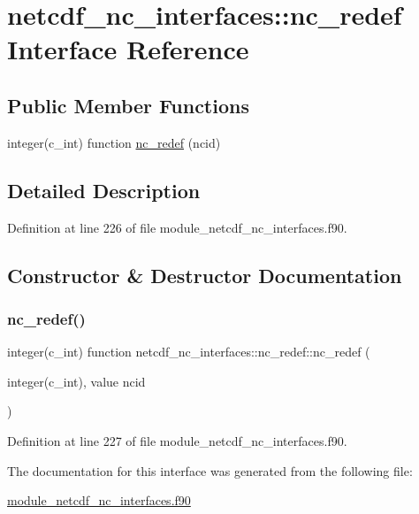 \hypertarget{interfacenetcdf__nc__interfaces_1_1nc__redef}{}\section{netcdf\+\_\+nc\+\_\+interfaces\+:\+:nc\+\_\+redef Interface Reference}
\label{interfacenetcdf__nc__interfaces_1_1nc__redef}
\subsection*{Public Member Functions}
\begin{DoxyCompactItemize}
\item 
integer(c\+\_\+int) function \hyperlink{interfacenetcdf__nc__interfaces_1_1nc__redef_a376167f0f58a802775e3701f8acf2d70}{nc\+\_\+redef} (ncid)
\end{DoxyCompactItemize}


\subsection{Detailed Description}


Definition at line 226 of file module\+\_\+netcdf\+\_\+nc\+\_\+interfaces.\+f90.



\subsection{Constructor \& Destructor Documentation}
\mbox{\label{interfacenetcdf__nc__interfaces_1_1nc__redef_a376167f0f58a802775e3701f8acf2d70}} 
\subsubsection{\texorpdfstring{nc\+\_\+redef()}{nc\_redef()}}
{\footnotesize\ttfamily integer(c\+\_\+int) function netcdf\+\_\+nc\+\_\+interfaces\+::nc\+\_\+redef\+::nc\+\_\+redef (\begin{DoxyParamCaption}\item[{integer(c\+\_\+int), value}]{ncid }\end{DoxyParamCaption})}



Definition at line 227 of file module\+\_\+netcdf\+\_\+nc\+\_\+interfaces.\+f90.



The documentation for this interface was generated from the following file\+:\begin{DoxyCompactItemize}
\item 
\hyperlink{module__netcdf__nc__interfaces_8f90}{module\+\_\+netcdf\+\_\+nc\+\_\+interfaces.\+f90}\end{DoxyCompactItemize}
